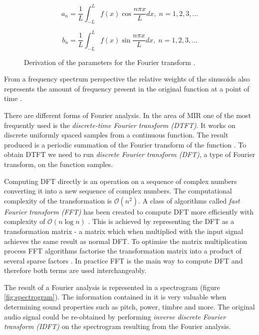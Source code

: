 \begin{figure}[H]
    \begin{equation}
        a_n = \frac{1}{L}\int_{-L}^{L}f(x)\cos\frac{n{\pi}x}{L}dx,\; n = 1,2,3,\dots
    \end{equation}

    \begin{equation}
        b_n = \frac{1}{L}\int_{-L}^{L}f(x)\sin\frac{n{\pi}x}{L}dx,\; n = 1,2,3,\dots
    \end{equation}
    \caption[Fourier series parameter derivation]{Derivation of the parameters for the Fourier transform \cite{fourierequations}.}
\end{figure}



From a frequency spectrum perspective the relative weights of the sinusoids also
represents the amount of frequency present in the original function at a point
of time \cite{wiki:fourier}. 

There are different forms of Fourier analysis. In the area of MIR one of the
most frequently used is the \textit{discrete-time Fourier transform (DTFT)}. It
works on discrete uniformly spaced samples from a continuous function. The
result produced is a periodic summation of the Fourier transform of the function
\cite{wiki:dtft}. To obtain DTFT we need to run \textit{discrete Fourier
transform (DFT)}, a type of Fourier transform, on the function samples. 

Computing DFT directly is an operation on a sequence of complex numbers
converting it into a new sequence of complex numbers. The computational
complexity of the transformation is $\mathcal{O}(n^2)$. A class of algorithms
called \textit{fast Fourier transform (FFT)} has been created to compute DFT
more efficiently with complexity of $\mathcal{O}(n\log{}n)$ \cite{fft}. This is
achieved by representing the DFT as a transformation matrix - a matrix which
when multiplied with the input signal achieves the same result as normal DFT. To
optimise the matrix multiplication process FFT algorithms factorise the
transformation matrix into a product of several sparse factors \cite{wiki:fft}.
In practice FFT is the main way to compute DFT and therefore both terms are used
interchangeably.

The result of a Fourier analysis is represented in a spectrogram (figure
\ref{fig:spectrogram}). The information contained in it is very valuable when
determining sound properties such as pitch, power, timbre and more. The original
audio signal could be re-obtained by performing \textit{inverse discrete Fourier
transform (IDFT)} on the spectrogram resulting from the Fourier analysis.

